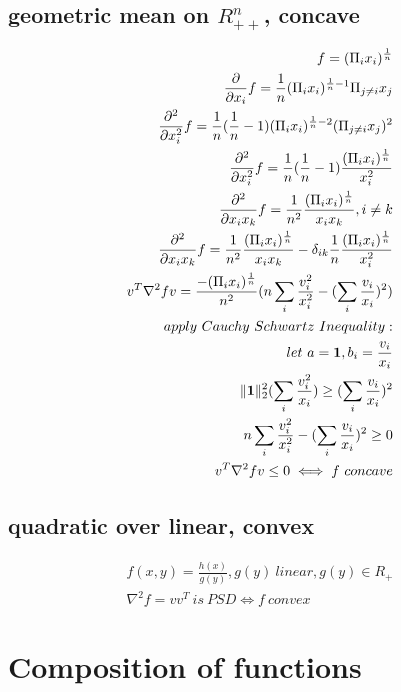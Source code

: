 \documentclass[8pt]{extarticle}
\begin{document}
\begin{multicols*}{2}
  \subsection{geometric mean on $R_{++}^n$, concave}
  \begin{align*}
    f=(\Pi_i x_i)^{\frac{1}{n}}\\
    \frac{\partial}{\partial x_i} f = \frac{1}{n}(\Pi_i x_i)^{\frac{1}{n}-1}\Pi_{j\not=i}x_j\\
    \frac{\partial^2}{\partial x_i^2} f = \frac{1}{n}(\frac{1}{n}-1)(\Pi_i x_i)^{\frac{1}{n}-2}(\Pi_{j\not=i}x_j)^2\\
    \frac{\partial^2}{\partial x_i^2} f = \frac{1}{n}(\frac{1}{n}-1)\frac{(\Pi_i x_i)^{\frac{1}{n}}}{x_i^2}\\
    \frac{\partial^2}{\partial x_i x_k} f = \frac{1}{n^2}\frac{(\Pi_i x_i)^{\frac{1}{n}}}{x_i x_k}, i\not=k\\
    \frac{\partial^2}{\partial x_i x_k} f = \frac{1}{n^2}\frac{(\Pi_i x_i)^{\frac{1}{n}}}{x_i x_k} -\delta_{ik} \frac{1}{n}\frac{(\Pi_i x_i)^{\frac{1}{n}}}{x_i^2}
    \\
    v^T \nabla^2 f v = \frac{-(\Pi_i x_i)^{\frac{1}{n}}}{n^2}(n \sum_i \frac{v_i^2}{x_i^2} - (\sum_i \frac{v_i}{x_i})^2)\\\
    apply\ Cauchy\ Schwartz\ Inequality:\\
    let\ a=\bold{1}, b_i = \frac{v_i}{x_i}\\
    \|\bold{1}\|_2^2 (\sum_i \frac{v_i^2}{x_i}) \geq (\sum_i \frac{v_i}{x_i})^2\\
    n \sum_i \frac{v_i^2}{x_i^2} - (\sum_i \frac{v_i}{x_i})^2 \geq 0\\
    v^T \nabla^2 f v \leq 0 \iff f\ concave
  \end{align*}

  \subsection{quadratic over linear, convex}
  \begin{align*}
    f(x,y) = \frac{h(x)}{g(y)}, g(y) \ linear, g(y) \in R_+\\
    \nabla^2 f = vv^T \ is\ PSD \iff f\ convex
  \end{align*}

  \vfill\null
  \columnbreak
  
  \section{Composition of functions}


\end{multicols*}
\end{document}

